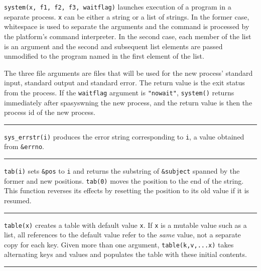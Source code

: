 \noindent
{}\texttt{system(x, f1, f2, f3, waitflag)} launches
execution of a program in a separate process. \texttt{x} can be either
a string or a list of strings. In the former case, whitespace is used
to separate the arguments and the command is processed by the
platform's command interpreter. In the second case,
each member of the list is an argument and the second and subsequent
list elements are passed unmodified to the program named in the first
element of the list.

The three file arguments are files that will be used for the new
process' standard input, standard output and standard
error. The return value is the exit status from the process. If the
\texttt{waitflag} argument is
\texttt{"nowait"}, \texttt{system()}
returns immediately after spasyswning the new process, and the return
value is then the process id of the new process.

\bigskip\hrule\vspace{0.1cm}

\noindent
{}\texttt{sys\_errstr(i)} produces the error string
corresponding to \texttt{i}, a value obtained from \texttt{\&errno}.

\bigskip\hrule\vspace{0.1cm}

\noindent
{}\texttt{tab(i)} sets \texttt{\&pos} to \texttt{i} and
returns the substring of \texttt{\&subject} spanned by the former and
new positions. \texttt{tab(0)} moves the position to the end of the
string. This function reverses its effects by resetting the position to
its old value if it is resumed.

\bigskip\hrule\vspace{0.1cm}

\noindent
{}\texttt{table(x)} creates a table with default value
\texttt{x}. If \texttt{x} is a mutable value such as a list, all
references to the default value refer to the \textit{same} value, not a
separate copy for each key. Given more than one argument,
\texttt{table(k,v,...x)} takes alternating keys and values and
populates the table with these initial contents.

\bigskip\hrule\vspace{0.1cm}

